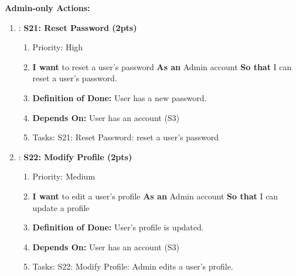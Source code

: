\textbf{Admin-only Actions:}
\begin{enumerate}
    \item: \textbf{S21: Reset Password (2pts)}
    \begin{enumerate}
        \item Priority: High 
        \item \textbf{I want} to reset a user's password \textbf{As an} Admin account \textbf{So that} I can reset a user's password.
        \item \textbf{Definition of Done:} User has a new password.
        \item \textbf{Depends On:} User has an account (S3)
        \item Tasks: S21: Reset Password: reset a user's password
    \end{enumerate}

    \item: \textbf{S22: Modify Profile (2pts)}
    \begin{enumerate}
        \item Priority: Medium
        \item \textbf{I want} to edit a user's profile \textbf{As an} Admin account \textbf{So that} I can update a profile
        \item \textbf{Definition of Done:} User's profile is updated.
        \item \textbf{Depends On:} User has an account (S3)
        \item Tasks: S22: Modify Profile: Admin edits a user's profile.
    \end{enumerate}
\end{enumerate}

